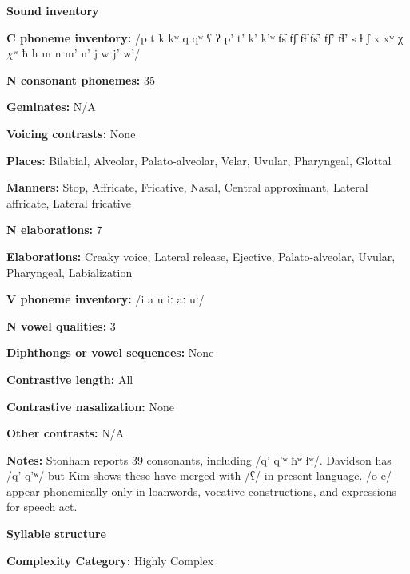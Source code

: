 \textbf{Sound inventory}



\textbf{C phoneme inventory:} /p t k kʷ q qʷ ʕ ʔ p’ t’ k’ k’ʷ t͡s t͡ʃ t͡ɬ t͡s’ t͡ʃ’ t͡ɬ’ s ɬ ʃ x xʷ χ $\chi ʷ$ ħ h m n m’ n’ j w j’ w’/



\textbf{N consonant phonemes:} 35



\textbf{Geminates:} N/A



\textbf{Voicing contrasts:} None



\textbf{Places:} Bilabial, Alveolar, Palato-alveolar, Velar, Uvular, Pharyngeal, Glottal



\textbf{Manners:} Stop, Affricate, Fricative, Nasal, Central approximant, Lateral affricate, Lateral fricative



\textbf{N elaborations:} 7



\textbf{Elaborations:} Creaky voice, Lateral release, Ejective, Palato-alveolar, Uvular, Pharyngeal, Labialization



\textbf{V phoneme inventory:} /i a u iː aː uː/



\textbf{N vowel qualities:} 3



\textbf{Diphthongs or vowel sequences:} None



\textbf{Contrastive length:} All



\textbf{Contrastive nasalization:} None



\textbf{Other contrasts:} N/A



\textbf{Notes:} Stonham reports 39 consonants, including /q’ q’ʷ ħʷ ɬʷ/. Davidson has /q’ q’ʷ/ but Kim shows these have merged with /ʕ/ in present language. /o e/ appear phonemically only in loanwords, vocative constructions, and expressions for speech act.



\textbf{Syllable structure}



\textbf{Complexity Category:} Highly Complex



